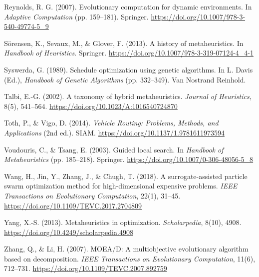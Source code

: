 \documentclass[conference]{IEEEtran}
\begin{document}
\begin{thebibliography}{99}
Reynolds, R. G. (2007). Evolutionary computation for dynamic environments. In \textit{Adaptive Computation} (pp. 159–181). Springer. \url{https://doi.org/10.1007/978-3-540-49774-5_9}

Sörensen, K., Sevaux, M., \& Glover, F. (2013). A history of metaheuristics. In \textit{Handbook of Heuristics}. Springer. \url{https://doi.org/10.1007/978-3-319-07124-4_4-1}

Syswerda, G. (1989). Schedule optimization using genetic algorithms. In L. Davis (Ed.), \textit{Handbook of Genetic Algorithms} (pp. 332–349). Van Nostrand Reinhold.

Talbi, E.-G. (2002). A taxonomy of hybrid metaheuristics. \textit{Journal of Heuristics}, 8(5), 541–564. \url{https://doi.org/10.1023/A:1016540724870}

Toth, P., \& Vigo, D. (2014). \textit{Vehicle Routing: Problems, Methods, and Applications} (2nd ed.). SIAM. \url{https://doi.org/10.1137/1.9781611973594}

Voudouris, C., \& Tsang, E. (2003). Guided local search. In \textit{Handbook of Metaheuristics} (pp. 185–218). Springer. \url{https://doi.org/10.1007/0-306-48056-5_8}

Wang, H., Jin, Y., Zhang, J., \& Chugh, T. (2018). A surrogate-assisted particle swarm optimization method for high-dimensional expensive problems. \textit{IEEE Transactions on Evolutionary Computation}, 22(1), 31–45. \url{https://doi.org/10.1109/TEVC.2017.2704809}

Yang, X.-S. (2013). Metaheuristics in optimization. \textit{Scholarpedia}, 8(10), 4908. \url{https://doi.org/10.4249/scholarpedia.4908}

Zhang, Q., \& Li, H. (2007). MOEA/D: A multiobjective evolutionary algorithm based on decomposition. \textit{IEEE Transactions on Evolutionary Computation}, 11(6), 712–731. \url{https://doi.org/10.1109/TEVC.2007.892759}

\end{thebibliography}
\end{document}
